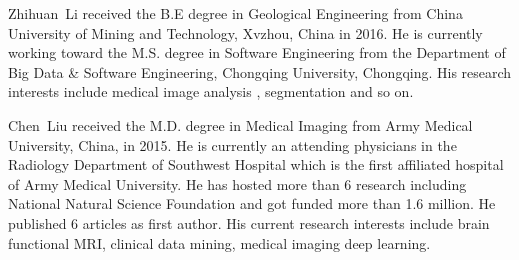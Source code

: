 \documentclass[journal]{IEEEtran}
\begin{document}
\vspace{-0.5cm}

\begin{IEEEbiography}{Zhihuan~Li}
    received the B.E degree in Geological Engineering from China University of Mining and Technology, Xvzhou, China in 2016. He is currently working toward the M.S. degree in Software Engineering from the Department of Big Data \& Software Engineering, Chongqing University, Chongqing.
	His research interests include medical image analysis , segmentation and so on.
\end{IEEEbiography}

\vspace{-0.5cm}
\begin{IEEEbiography}{Chen~Liu}
    received the M.D. degree in Medical Imaging from Army Medical University, China, in 2015. He is currently an attending physicians in the Radiology Department of Southwest Hospital which is the first affiliated hospital of Army Medical University. He has hosted more than 6 research including National Natural Science Foundation and got funded more than 1.6 million. He published 6 articles as first author. His current research interests include brain functional MRI, clinical data mining, medical imaging deep learning.
\end{IEEEbiography}




\vspace{-0.5cm}
\end{document}
